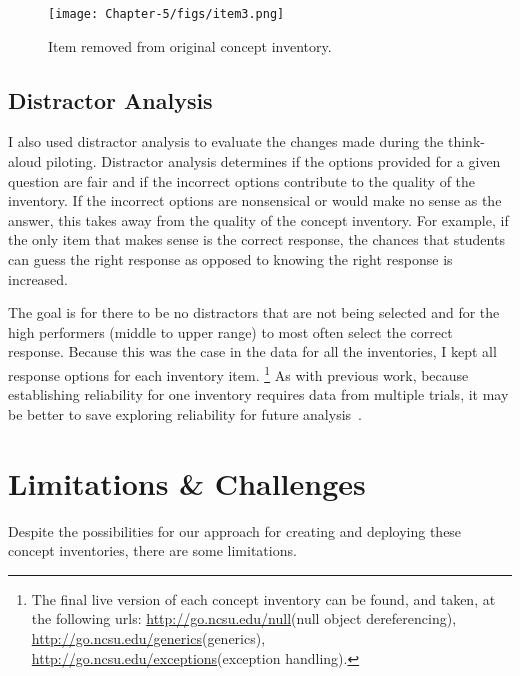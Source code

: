 	
	\begin{figure}[]
		\centering
		\texttt{[image: Chapter-5/figs/item3.png]}
		\caption{Item removed from original concept inventory. \label{fig:item3}}
	\end{figure}

\subsection{Distractor Analysis}
I also used distractor analysis to evaluate the changes made during the think-aloud piloting. Distractor analysis determines if the options provided for a given question are fair and if the incorrect options contribute to the quality of the inventory. If the incorrect options are nonsensical or would make no sense as the answer, this takes away from the quality of the concept inventory. For example, if the only item that makes sense is the correct response, the chances that students can guess the right response as opposed to knowing the right response is increased.

The goal is for there to be no distractors that are not being selected and for the high performers (middle to upper range) to most often select the correct response. Because this was the case in the data for all the inventories, I kept all response options for each inventory item.
\footnote{The final live version of each concept inventory can be found, and taken, at the following urls: \url{http://go.ncsu.edu/null}(null object dereferencing), \url{http://go.ncsu.edu/generics}(generics), \url{http://go.ncsu.edu/exceptions}(exception handling).}
As with previous work, because establishing reliability for one inventory requires data from multiple trials, it may be better to save exploring reliability for future analysis~\cite{tew2010developing,tew2010assessing}.


	


\section{Limitations \& Challenges}\label{sec:limits}

Despite the possibilities for our approach for creating and deploying these concept inventories, there are some limitations. 

